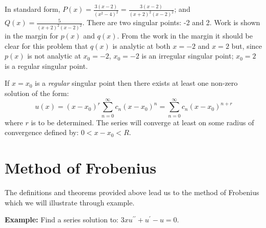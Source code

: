 \noindent In standard form, $P(x) = \frac{3(x-2)}{(x^2-4)^2} = \frac{3(x-2)}{(x+2)^2(x-2)^2}$; and $Q(x) = \frac{5}{(x+2)^2(x-2)^2}$.  There are two singular points: -2 and 2.
Work is shown in the margin for $p(x)$ and $q(x)$.  From the work in the margin it should be clear for this problem that $q(x)$ is analytic at both $x=-2$ and $x=2$ but, since $p(x)$ is not analytic at $x_0=-2$, $x_0=-2$ is an irregular singular point; $x_0=2$ is a regular singular point.

\begin{theorem}
If $x=x_0$ is a \emph{regular} singular point then there exists at least one non-zero solution of the form:
$$u(x) = (x-x_0)^r\sum\limits_{n=0}^{\infty}c_n(x-x_0)^n = \sum\limits_{n=0}^{\infty}c_n(x-x_0)^{n+r}$$
where $r$ is to be determined.  The series will converge at least on some radius of convergence defined by: $0<x-x_0<R$.
\label{thm:frobenius}
\end{theorem}

\section{Method of Frobenius}
The definitions and theorems provided above lead us to the method of Frobenius which we will illustrate through example.

\vspace{0.25cm}

\noindent\textbf{Example:} Find a series solution to: $3xu^{\prime \prime} + u^{\prime} - u = 0$.

